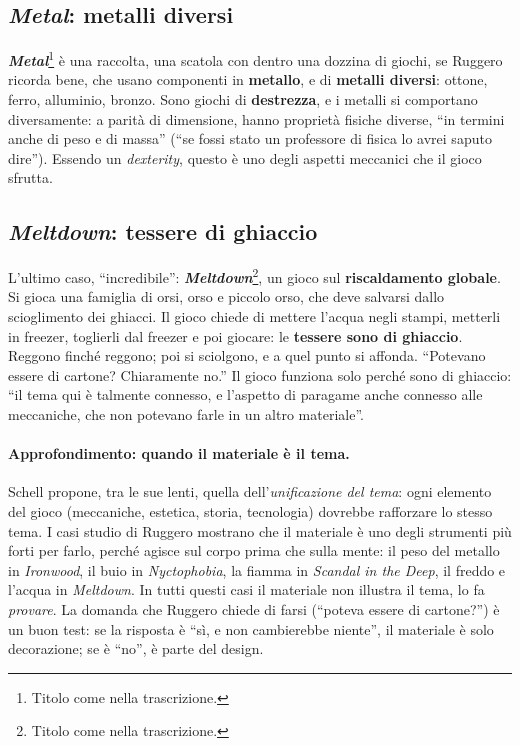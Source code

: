 \subsection{\emph{Metal}: metalli diversi}



\textbf{\emph{Metal}}\footnote{Titolo come nella trascrizione.} è una raccolta, una
scatola con dentro una dozzina di giochi, se Ruggero ricorda bene, che usano componenti
in \textbf{metallo}, e di \textbf{metalli diversi}: ottone, ferro, alluminio, bronzo. Sono
giochi di \textbf{destrezza}, e i metalli si comportano diversamente: a parità di
dimensione, hanno proprietà fisiche diverse, ``in termini anche di peso e di massa''
(``se fossi stato un professore di fisica lo avrei saputo dire''). Essendo un
\emph{dexterity}, questo è uno degli aspetti meccanici che il gioco sfrutta.

\subsection{\emph{Meltdown}: tessere di ghiaccio}



L'ultimo caso, ``incredibile'': \textbf{\emph{Meltdown}}\footnote{Titolo come nella
trascrizione.}, un gioco sul \textbf{riscaldamento globale}. Si gioca una famiglia di
orsi, orso e piccolo orso, che deve salvarsi dallo scioglimento dei ghiacci. Il gioco
chiede di mettere l'acqua negli stampi, metterli in freezer, toglierli dal freezer e poi
giocare: le \textbf{tessere sono di ghiaccio}. Reggono finché reggono; poi si sciolgono, e
a quel punto si affonda. ``Potevano essere di cartone? Chiaramente no.'' Il gioco
funziona solo perché sono di ghiaccio: ``il tema qui è talmente connesso, e l'aspetto di
paragame anche connesso alle meccaniche, che non potevano farle in un altro
materiale''.

\paragraph{Approfondimento: quando il materiale è il tema.} Schell propone, tra le sue
lenti, quella dell'\emph{unificazione del tema}: ogni elemento del gioco (meccaniche,
estetica, storia, tecnologia) dovrebbe rafforzare lo stesso tema. I casi studio di
Ruggero mostrano che il materiale è uno degli strumenti più forti per farlo, perché agisce
sul corpo prima che sulla mente: il peso del metallo in \emph{Ironwood}, il buio in
\emph{Nyctophobia}, la fiamma in \emph{Scandal in the Deep}, il freddo e l'acqua in
\emph{Meltdown}. In tutti questi casi il materiale non illustra il tema, lo fa
\emph{provare}. La domanda che Ruggero chiede di farsi (``poteva essere di cartone?'')
è un buon test: se la risposta è ``sì, e non cambierebbe niente'', il materiale è solo
decorazione; se è ``no'', è parte del design.

